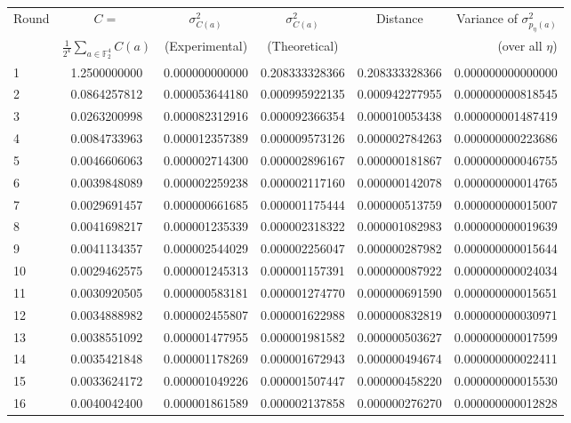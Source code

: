 \begin{center}
\begin{scriptsize}
\begin{tabular}{l*{4}{c}r} \label{table:comparing_hypothesis}
Round & $C=$ & $\sigma^2_{C(a)}$ &  $\sigma^2_{C(a)}$ & Distance & Variance of $\sigma^2_{p_{\eta}(a)}$ \\
& $\frac{1}{2^4}\sum_{a \in \mathbb{F}_2^4}C(a)$ & (Experimental) & (Theoretical) & & (over all $\eta$)\\
\hline
1 & 1.2500000000 & 0.000000000000 & 0.208333328366 & 0.208333328366 & 0.000000000000000\\
2 & 0.0864257812 & 0.000053644180 & 0.000995922135 & 0.000942277955 & 0.000000000818545\\
3 & 0.0263200998 & 0.000082312916 & 0.000092366354 & 0.000010053438 & 0.000000001487419\\
4 & 0.0084733963 & 0.000012357389 & 0.000009573126 & 0.000002784263 & 0.000000000223686\\
5 & 0.0046606063 & 0.000002714300 & 0.000002896167 & 0.000000181867 & 0.000000000046755\\
6 & 0.0039848089 & 0.000002259238 & 0.000002117160 & 0.000000142078 & 0.000000000014765\\
7 & 0.0029691457 & 0.000000661685 & 0.000001175444 & 0.000000513759 & 0.000000000015007\\
8 & 0.0041698217 & 0.000001235339 & 0.000002318322 & 0.000001082983 & 0.000000000019639\\
9 & 0.0041134357 & 0.000002544029 & 0.000002256047 & 0.000000287982 & 0.000000000015644\\
10 & 0.0029462575 & 0.000001245313 & 0.000001157391 & 0.000000087922 & 0.000000000024034\\
11 & 0.0030920505 & 0.000000583181 & 0.000001274770 & 0.000000691590 & 0.000000000015651\\
12 & 0.0034888982 & 0.000002455807 & 0.000001622988 & 0.000000832819 & 0.000000000030971\\
13 & 0.0038551092 & 0.000001477955 & 0.000001981582 & 0.000000503627 & 0.000000000017599\\
14 & 0.0035421848 & 0.000001178269 & 0.000001672943 & 0.000000494674 & 0.000000000022411\\
15 & 0.0033624172 & 0.000001049226 & 0.000001507447 & 0.000000458220 & 0.000000000015530\\
16 & 0.0040042400 & 0.000001861589 & 0.000002137858 & 0.000000276270 & 0.000000000012828\\

\end{tabular}
\end{scriptsize}
\end{center}

